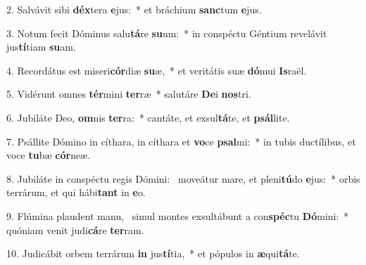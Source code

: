 2. Salvávit sibi \textbf{déx}tera \textbf{e}jus:~*  et bráchium \textbf{sanc}tum \textbf{e}jus.\

3. Notum fecit Dóminus salu\textbf{tá}re \textbf{su}um:~*  in conspéctu Géntium revelávit jus\textbf{tí}tiam \textbf{su}am.\

4. Recordátus est miseri\textbf{cór}diæ \textbf{su}æ,~*  et veritátis suæ \textbf{dó}mui \textbf{Is}raël.\

5. Vidérunt omnes \textbf{tér}mini \textbf{ter}ræ~*  salutáre \textbf{De}i \textbf{nos}tri.\

6. Jubiláte Deo, \textbf{om}nis \textbf{ter}ra:~*  cantáte, et exsul\textbf{tá}te, et \textbf{psál}lite.\

7. Psállite Dómino in cíthara, in cíthara et \textbf{vo}ce \textbf{psal}mi:~*  in tubis ductílibus, et voce \textbf{tu}bæ \textbf{cór}neæ.\

8. Jubiláte in conspéctu regis Dómini: \dag\  moveátur mare, et pleni\textbf{tú}do \textbf{e}jus:~*  orbis terrárum, et qui hábi\textbf{tant} in \textbf{e}o.\

9. Flúmina plaudent manu, \dag\  simul montes exsultábunt a con\textbf{spéc}tu \textbf{Dó}mini:~*  quóniam venit judi\textbf{cá}re \textbf{ter}ram.\

10. Judicábit orbem terrárum \textbf{in} jus\textbf{tí}tia,~*  et pópulos in \textbf{æ}qui\textbf{tá}te.\

